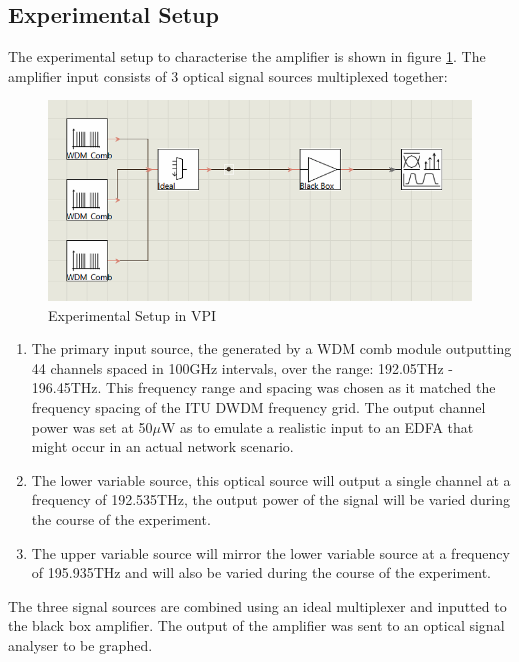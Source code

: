 \subsection{Experimental Setup}
The experimental setup to characterise the amplifier is shown in figure \ref{fig:tw_amp_char}.
The amplifier input consists of 3 optical signal sources multiplexed together:

\begin{figure}
    \centering
    \includegraphics[width=\linewidth]{images/technical_work/section_1_characterisation/amp_char_ex_setup.png}
    \caption{Experimental Setup in VPI}
    \label{fig:tw_amp_char}
\end{figure}


\begin{enumerate}
    \item The primary input source, the generated by a WDM comb module outputting 44 channels spaced in 100GHz intervals, over the range: 192.05THz - 196.45THz. This frequency range and spacing was chosen as it matched the frequency spacing of the ITU DWDM frequency grid. The output channel power was set at 50$\mu$W as to emulate a realistic input to an EDFA that might occur in an actual network scenario. \\
    
    \item The lower variable source, this optical source will output a single channel at a frequency of 192.535THz, the output power of the signal will be varied during the course of the experiment.\\
    
    \item The upper variable source will mirror the lower variable source at a frequency of 195.935THz and will also be varied during the course of the experiment.  
\end{enumerate}


The three signal sources are combined using an ideal multiplexer and inputted to the black box amplifier. The output of the amplifier was sent to an optical signal analyser to be graphed.

